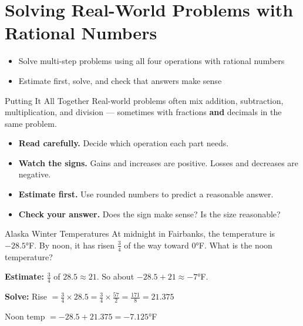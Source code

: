 \section{Solving Real-World Problems with Rational Numbers}

\begin{learningGoals}
\begin{itemize}
    \item Solve multi-step problems using all four operations with rational numbers
    \item Estimate first, solve, and check that answers make sense
\end{itemize}
\end{learningGoals}

\begin{conceptBox}{Putting It All Together}
Real-world problems often mix addition, subtraction, multiplication, and division — sometimes with fractions \textbf{and} decimals in the same problem.
\begin{itemize}[leftmargin=*]
    \item \textbf{Read carefully.} Decide which operation each part needs.
    \item \textbf{Watch the signs.} Gains and increases are positive. Losses and decreases are negative.
    \item \textbf{Estimate first.} Use rounded numbers to predict a reasonable answer.
    \item \textbf{Check your answer.} Does the sign make sense? Is the size reasonable?
\end{itemize}
\end{conceptBox}

\begin{workedExample}{Alaska Winter Temperatures}
At midnight in Fairbanks, the temperature is $-28.5°$F. By noon, it has risen $\frac{3}{4}$ of the way toward $0°$F. What is the noon temperature?

\textbf{Estimate:} $\frac{3}{4}$ of $28.5 \approx 21$. So about $-28.5 + 21 \approx -7°$F.

\textbf{Solve:} Rise $= \frac{3}{4} \times 28.5 = \frac{3}{4} \times \frac{57}{2} = \frac{171}{8} = 21.375$

Noon temp $= -28.5 + 21.375 = -7.125°$F
\end{workedExample}


